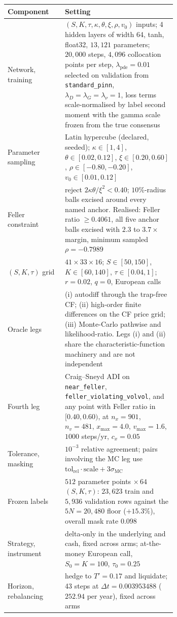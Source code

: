 \documentclass[10pt]{article}
\begin{document}
\begin{table}[h]
\centering\footnotesize\setlength{\tabcolsep}{4pt}
\begin{tabular}{@{}lp{0.66\linewidth}@{}}
\toprule
Component & Setting \\
\midrule
Network, training & $(S, K, \tau, \kappa, \theta, \xi, \rho, v_0)$ inputs; 4 hidden layers of width 64, tanh, float32, $13{,}121$ parameters; $20{,}000$ steps, $4{,}096$ collocation points per step, $\lambda_{\mathrm{pde}}=0.01$ selected on validation from \texttt{standard\_pinn}, $\lambda_D=\lambda_G=\lambda_\nu=1$, loss terms scale-normalised by label second moment with the gamma scale frozen from the true consensus \\
Parameter sampling & Latin hypercube (declared, seeded); $\kappa\in[1,4]$, $\theta\in[0.02,0.12]$, $\xi\in[0.20,0.60]$, $\rho\in[-0.80,-0.20]$, $v_0\in[0.01,0.12]$ \\
Feller constraint & reject $2\kappa\theta/\xi^{2}<0.40$; $10\%$-radius balls excised around every named anchor. Realised: Feller ratio $\geq 0.4061$, all five anchor balls excised with $2.3$ to $3.7\times$ margin, minimum sampled $\rho = -0.7989$ \\
$(S,K,\tau)$ grid & $41\times33\times16$; $S\in[50,150]$, $K\in[60,140]$, $\tau\in[0.04,1]$; $r=0.02$, $q=0$, European calls \\
Oracle legs & (i) autodiff through the trap-free CF; (ii) high-order finite differences on the CF price grid; (iii) Monte-Carlo pathwise and likelihood-ratio. Legs (i) and (ii) share the characteristic-function machinery and are not independent \\
Fourth leg & Craig--Sneyd ADI on \texttt{near\_feller}, \texttt{feller\_violating\_volvol}, and any point with Feller ratio in $[0.40,0.60)$, at $n_x{=}901$, $n_v{=}481$, $x_{\max}{=}4.0$, $v_{\max}{=}1.6$, $1000$ steps/yr, $c_x{=}0.05$ \\
Tolerance, masking & $10^{-3}$ relative agreement; pairs involving the MC leg use $\mathrm{tol_{rel}}\cdot\mathrm{scale} + 3\sigma_{\mathrm{MC}}$ \\
Frozen labels & $512$ parameter points $\times\,64$ $(S,K,\tau)$: $23{,}623$ train and $5{,}936$ validation rows against the $5N = 20{,}480$ floor ($+15.3\%$), overall mask rate $0.098$ \\
Strategy, instrument & delta-only in the underlying and cash, fixed across arms; at-the-money European call, $S_0{=}K{=}100$, $\tau_0{=}0.25$ \\
Horizon, rebalancing & hedge to $T'{=}0.17$ and liquidate; 43 steps at $\Delta t=0.003953488$ ($252.94$ per year), fixed across arms \\

\end{tabular}
\end{table}
\end{document}
